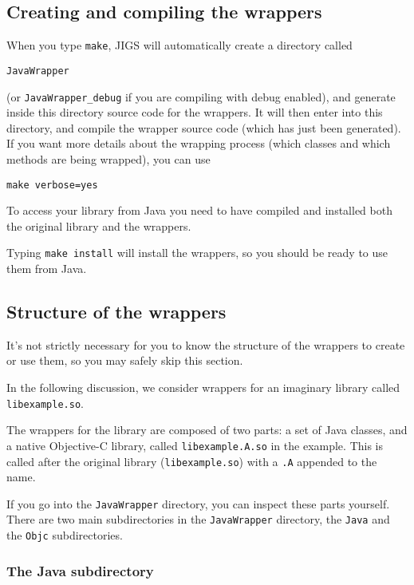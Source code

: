 \subsection{Creating and compiling the wrappers}

When you type \texttt{make}, JIGS will automatically create a
directory called
\begin{verbatim}
JavaWrapper
\end{verbatim}
(or \texttt{JavaWrapper\_debug} if you are compiling with debug
enabled), and generate inside this directory source code for the
wrappers.  It will then enter into this directory, and compile the
wrapper source code (which has just been generated).  If you want more
details about the wrapping process (which classes and which methods
are being wrapped), you can use
\begin{verbatim}
make verbose=yes
\end{verbatim}

To access your library from Java you need to have compiled and
installed both the original library and the wrappers.

Typing \texttt{make install} will install the wrappers, so you should
be ready to use them from Java.

\subsection{Structure of the wrappers}\label{wrapper-structure}

It's not strictly necessary for you to know the structure of the
wrappers to create or use them, so you may safely skip this section.

In the following discussion, we consider wrappers for an imaginary
library called \texttt{libexample.so}.

The wrappers for the library are composed of two parts: a set of Java
classes, and a native Objective-C library, called
\texttt{libexample.A.so} in the example.  This is called after the 
original library (\texttt{libexample.so}) with a \texttt{.A} appended
to the name.

If you go into the \texttt{JavaWrapper} directory, you can inspect
these parts yourself.  There are two main subdirectories in the
\texttt{JavaWrapper} directory, the \texttt{Java} and the
\texttt{Objc} subdirectories.

\subsubsection{The Java subdirectory}


